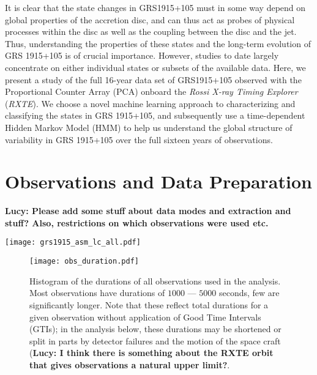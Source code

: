 \documentclass[12pt]{emulateapj}
\newcommand{\project}[1]{\textsl{#1}}
\newcommand{\rxte}{\project{RXTE}}
\begin{document}
It is clear that the state changes in GRS1915+105 must in some way depend on global properties of the accretion disc, and can thus act as probes of physical processes within the disc as well as the coupling between the disc and the jet. Thus, understanding the properties of these states and the long-term evolution of GRS 1915+105 is of crucial importance. However, studies to date largely concentrate on either individual states or subsets of the available data. 
Here, we present a study of the full 16-year data set of GRS1915+105 observed with the Proportional Counter Array (PCA) onboard the \textit{Rossi X-ray Timing Explorer} (\rxte). We choose a novel machine learning approach to characterizing and classifying the states in GRS 1915+105, and subsequently use a time-dependent Hidden Markov Model (HMM) to help us understand the global structure of variability in GRS 1915+105 over the full sixteen years of observations.


\section{Observations and Data Preparation}

{\bf Lucy: Please add some stuff about data modes and extraction and stuff? Also, restrictions on which observations were used etc.}

\begin{figure*}[htbp]
\begin{center}
\texttt{[image: grs1915\_asm\_lc\_all.pdf]}
\caption{\rxte\ All-Sky Monitor (ASM) light curve for the entire duration of the \rxte\ mission. Each panel covers $500$ days. Shown in blue is the ASM light curve. In green, the start points of the \rxte/PCA observations with high enough time resolution to be relevant for this analysis. The \rxte/PCA observations span the entire lifetime and provide a 
sample with high coverage in time, albeit with a bias toward active periods of the system.}
\label{fig:asm_total}
\end{center}
\end{figure*}

\begin{figure}[htbp]
\begin{center}
\texttt{[image: obs\_duration.pdf]}
\caption{Histogram of the durations of all observations used in the analysis. Most observations have durations of $1000$ --- $5000$ seconds, few are significantly longer. Note that these reflect total durations for a given observation without application of Good Time Intervals (GTIs); in the analysis below, these durations may be shortened or split in parts by detector failures and the motion of the space craft ({\bf Lucy: I think there is something about the RXTE orbit that gives observations a natural upper limit?}.}
\label{fig:obsdurations}
\end{center}
\end{figure}
\end{document}

